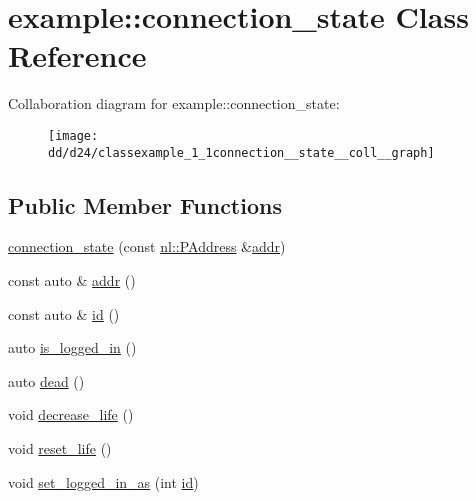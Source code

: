 \hypertarget{classexample_1_1connection__state}{}\section{example\+:\+:connection\+\_\+state Class Reference}
\label{classexample_1_1connection__state}


Collaboration diagram for example\+:\+:connection\+\_\+state\+:
\nopagebreak
\begin{figure}[H]
\begin{center}
\leavevmode
\texttt{[image: dd/d24/classexample\_1\_1connection\_\_state\_\_coll\_\_graph]}
\end{center}
\end{figure}
\subsection*{Public Member Functions}
\begin{DoxyCompactItemize}
\item 
\hyperlink{classexample_1_1connection__state_af377b7d90a6963fdfb883ca8835cdad5}{connection\+\_\+state} (const \hyperlink{structnl_1_1PAddress}{nl\+::\+P\+Address} \&\hyperlink{classexample_1_1connection__state_a6083472b5d65f3f8e56d04289b7be966}{addr})
\item 
const auto \& \hyperlink{classexample_1_1connection__state_a6083472b5d65f3f8e56d04289b7be966}{addr} ()
\item 
const auto \& \hyperlink{classexample_1_1connection__state_a82279791f9cb8e8dfe6b92cb9c0b70ab}{id} ()
\item 
auto \hyperlink{classexample_1_1connection__state_a2c153d17eb93e2e76cbcfb3f15312521}{is\+\_\+logged\+\_\+in} ()
\item 
auto \hyperlink{classexample_1_1connection__state_aa32407710da963988cf703bd7d84ac82}{dead} ()
\item 
void \hyperlink{classexample_1_1connection__state_a5b2b6a79f6204d766294478e30f5048b}{decrease\+\_\+life} ()
\item 
void \hyperlink{classexample_1_1connection__state_a337e173bbb88d80de14cb7681d96b6f9}{reset\+\_\+life} ()
\item 
void \hyperlink{classexample_1_1connection__state_a5c1c3cd333e82812c1c4976eaa1f33e4}{set\+\_\+logged\+\_\+in\+\_\+as} (int \hyperlink{classexample_1_1connection__state_a82279791f9cb8e8dfe6b92cb9c0b70ab}{id})
\end{DoxyCompactItemize}
